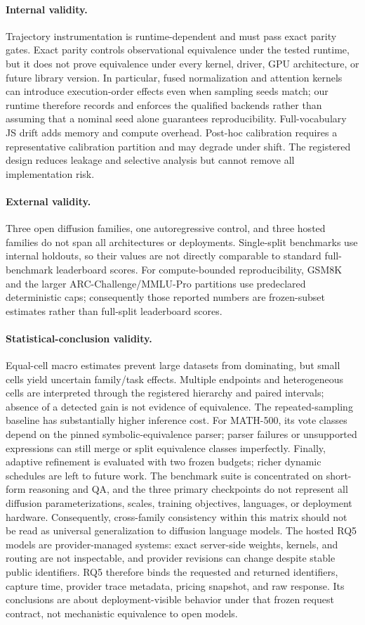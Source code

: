 \documentclass[10pt]{article}
\begin{document}
\paragraph{Internal validity.} Trajectory instrumentation is runtime-dependent and must pass exact parity gates. Exact parity controls observational equivalence under the tested runtime, but it does not prove equivalence under every kernel, driver, GPU architecture, or future library version. In particular, fused normalization and attention kernels can introduce execution-order effects even when sampling seeds match; our runtime therefore records and enforces the qualified backends rather than assuming that a nominal seed alone guarantees reproducibility. Full-vocabulary JS drift adds memory and compute overhead. Post-hoc calibration requires a representative calibration partition and may degrade under shift. The registered design reduces leakage and selective analysis but cannot remove all implementation risk.
\paragraph{External validity.} Three open diffusion families, one autoregressive control, and three hosted families do not span all architectures or deployments. Single-split benchmarks use internal holdouts, so their values are not directly comparable to standard full-benchmark leaderboard scores.
For compute-bounded reproducibility, GSM8K and the larger ARC-Challenge/MMLU-Pro
partitions use predeclared deterministic caps; consequently those reported
numbers are frozen-subset estimates rather than full-split leaderboard scores.
\paragraph{Statistical-conclusion validity.} Equal-cell macro estimates prevent large datasets from dominating, but small cells yield uncertain family/task effects. Multiple endpoints and heterogeneous cells are interpreted through the registered hierarchy and paired intervals; absence of a detected gain is not evidence of equivalence.
The repeated-sampling baseline has substantially higher inference cost. For MATH-500, its vote classes depend on the pinned symbolic-equivalence parser; parser failures or unsupported expressions can still merge or split equivalence classes imperfectly.
Finally, adaptive refinement is evaluated with two frozen budgets; richer dynamic schedules are left to future work.
The benchmark suite is concentrated on short-form reasoning and QA, and the
three primary checkpoints do not represent all diffusion parameterizations,
scales, training objectives, languages, or deployment hardware. Consequently,
cross-family consistency within this matrix should not be read as universal
generalization to diffusion language models.
The hosted RQ5 models are provider-managed systems: exact server-side weights,
kernels, and routing are not inspectable, and provider revisions can change
despite stable public identifiers. RQ5 therefore binds the requested and
returned identifiers, capture time, provider trace metadata, pricing snapshot,
and raw response. Its conclusions are about deployment-visible behavior under
that frozen request contract, not mechanistic equivalence to open models.
\end{document}
